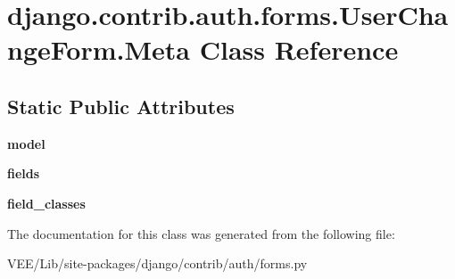 \hypertarget{classdjango_1_1contrib_1_1auth_1_1forms_1_1_user_change_form_1_1_meta}{}\section{django.\+contrib.\+auth.\+forms.\+User\+Change\+Form.\+Meta Class Reference}
\label{classdjango_1_1contrib_1_1auth_1_1forms_1_1_user_change_form_1_1_meta}
\subsection*{Static Public Attributes}
\begin{DoxyCompactItemize}
\item 
\mbox{\label{classdjango_1_1contrib_1_1auth_1_1forms_1_1_user_change_form_1_1_meta_abdf35dd6c306a314385e4485cca44c40}} 
{\bfseries model}
\item 
\mbox{\label{classdjango_1_1contrib_1_1auth_1_1forms_1_1_user_change_form_1_1_meta_a59c9b062d288a8c6374ea83d2b0fad91}} 
{\bfseries fields}
\item 
\mbox{\label{classdjango_1_1contrib_1_1auth_1_1forms_1_1_user_change_form_1_1_meta_a8f0e3a3e3168ae498304b13f9efdae61}} 
{\bfseries field\+\_\+classes}
\end{DoxyCompactItemize}


The documentation for this class was generated from the following file\+:\begin{DoxyCompactItemize}
\item 
V\+E\+E/\+Lib/site-\/packages/django/contrib/auth/forms.\+py\end{DoxyCompactItemize}
